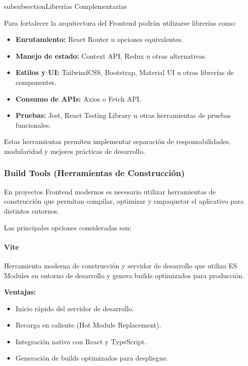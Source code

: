 \documentclass[12pt]{article}
\begin{document}
subsubsection{Librerías Complementarias}

Para fortalecer la arquitectura del Frontend podrán utilizarse librerías como:

\begin{itemize}
    \item \textbf{Enrutamiento:} React Router u opciones equivalentes.
    \item \textbf{Manejo de estado:} Context API, Redux u otras alternativas.
    \item \textbf{Estilos y UI:} TailwindCSS, Bootstrap, Material UI u otras librerías de componentes.
    \item \textbf{Consumo de APIs:} Axios o Fetch API.
    \item \textbf{Pruebas:} Jest, React Testing Library u otras herramientas de pruebas funcionales.
\end{itemize}

Estas herramientas permiten implementar separación de responsabilidades, modularidad y mejores prácticas de desarrollo.

\subsubsection{Build Tools (Herramientas de Construcción)}

En proyectos Frontend modernos es necesario utilizar herramientas de construcción que permitan compilar, optimizar y empaquetar el aplicativo para distintos entornos.

Las principales opciones consideradas son:

\paragraph{Vite}

Herramienta moderna de construcción y servidor de desarrollo que utiliza ES Modules en entorno de desarrollo y genera builds optimizados para producción.

\textbf{Ventajas:}
\begin{itemize}
    \item Inicio rápido del servidor de desarrollo.
    \item Recarga en caliente (Hot Module Replacement).
    \item Integración nativa con React y TypeScript.
    \item Generación de builds optimizados para despliegue.
\end{itemize}
\end{document}

